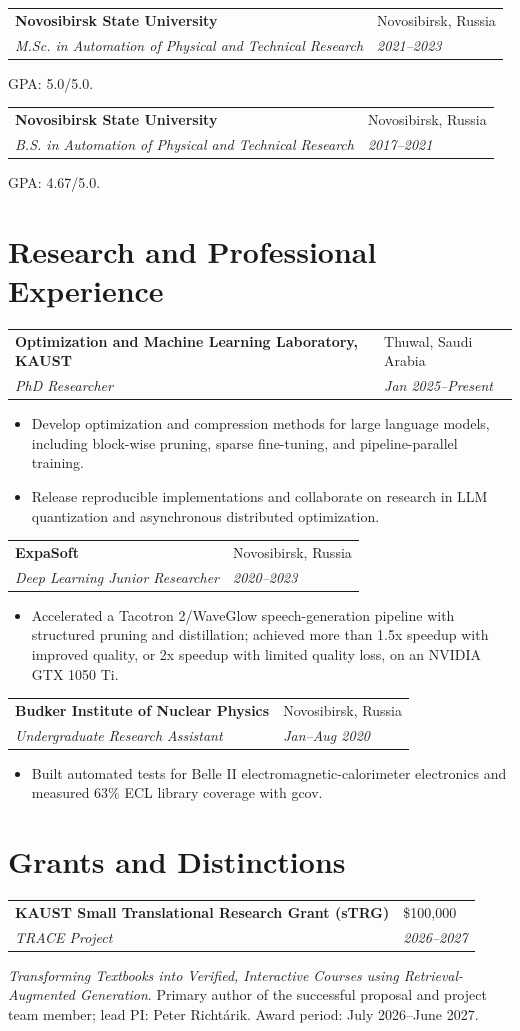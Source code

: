 \documentclass[10pt,letterpaper]{article}
\makeatletter
\newcommand{\cventry}[4]{%
  \begin{tabularx}{\textwidth}{@{}>{\raggedright\arraybackslash}X>{\raggedleft\arraybackslash}p{1.52in}@{}}
    \textbf{#1} & \textcolor{Muted}{#2} \\
    \textit{#3} & \textit{\textcolor{Muted}{#4}}
  \end{tabularx}\vspace{0.12em}
}
\newcommand{\cvdetail}[1]{%
  {\small #1\par}\vspace{0.30em}
}
\newenvironment{cvitems}{%
  \begin{itemize}[
    leftmargin=1.18em,
    label=\textcolor{Accent}{\raisebox{0.15ex}{\scriptsize$\bullet$}},
    itemsep=0.12em,
    topsep=0.12em,
    parsep=0pt,
    partopsep=0pt
  ]\small
}{%
  \end{itemize}\vspace{0.28em}
}
\makeatother
\begin{document}
\cventry{Novosibirsk State University}{Novosibirsk, Russia}{M.Sc. in Automation of Physical and Technical Research}{2021--2023}
\cvdetail{GPA: 5.0/5.0.}

\cventry{Novosibirsk State University}{Novosibirsk, Russia}{B.S. in Automation of Physical and Technical Research}{2017--2021}
\cvdetail{GPA: 4.67/5.0.}

\section{Research and Professional Experience}

\cventry{Optimization and Machine Learning Laboratory, KAUST}{Thuwal, Saudi Arabia}{PhD Researcher}{Jan 2025--Present}
\begin{cvitems}
  \item Develop optimization and compression methods for large language models, including block-wise pruning, sparse fine-tuning, and pipeline-parallel training.
  \item Release reproducible implementations and collaborate on research in LLM quantization and asynchronous distributed optimization.
\end{cvitems}

\cventry{ExpaSoft}{Novosibirsk, Russia}{Deep Learning Junior Researcher}{2020--2023}
\begin{cvitems}
  \item Accelerated a Tacotron 2/WaveGlow speech-generation pipeline with structured pruning and distillation; achieved more than 1.5x speedup with improved quality, or 2x speedup with limited quality loss, on an NVIDIA GTX 1050 Ti.
\end{cvitems}

\cventry{Budker Institute of Nuclear Physics}{Novosibirsk, Russia}{Undergraduate Research Assistant}{Jan--Aug 2020}
\begin{cvitems}
  \item Built automated tests for Belle II electromagnetic-calorimeter electronics and measured 63\% ECL library coverage with gcov.
\end{cvitems}

\section{Grants and Distinctions}

\cventry{KAUST Small Translational Research Grant (sTRG)}{\$100,000}{TRACE Project}{2026--2027}
\cvdetail{\textit{Transforming Textbooks into Verified, Interactive Courses using Retrieval-Augmented Generation}. Primary author of the successful proposal and project team member; lead PI: Peter Richt\'arik. Award period: July 2026--June 2027.}
\end{document}
